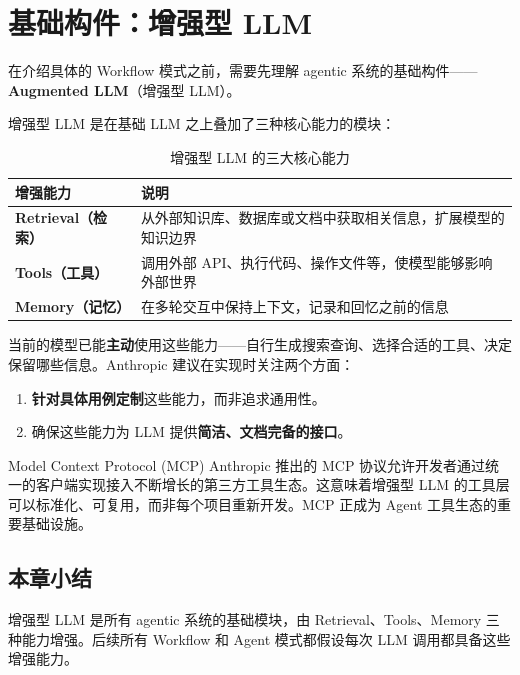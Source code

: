\section{基础构件：增强型 LLM}

在介绍具体的 Workflow 模式之前，需要先理解 agentic 系统的基础构件——\textbf{Augmented LLM}（增强型 LLM）。

增强型 LLM 是在基础 LLM 之上叠加了三种核心能力的模块：

\begin{table}[H]
\centering
\begin{tabular}{>{\bfseries}l p{10cm}}
\toprule
增强能力 & 说明 \\
\midrule
Retrieval（检索） & 从外部知识库、数据库或文档中获取相关信息，扩展模型的知识边界 \\
Tools（工具） & 调用外部 API、执行代码、操作文件等，使模型能够影响外部世界 \\
Memory（记忆） & 在多轮交互中保持上下文，记录和回忆之前的信息 \\
\bottomrule
\end{tabular}
\caption{增强型 LLM 的三大核心能力}
\end{table}

当前的模型已能\textbf{主动}使用这些能力——自行生成搜索查询、选择合适的工具、决定保留哪些信息。Anthropic 建议在实现时关注两个方面：

\begin{enumerate}
    \item \textbf{针对具体用例定制}这些能力，而非追求通用性。
    \item 确保这些能力为 LLM 提供\textbf{简洁、文档完备的接口}。
\end{enumerate}

\begin{knowledgebox}{Model Context Protocol (MCP)}
Anthropic 推出的 MCP 协议允许开发者通过统一的客户端实现接入不断增长的第三方工具生态。这意味着增强型 LLM 的工具层可以标准化、可复用，而非每个项目重新开发。MCP 正成为 Agent 工具生态的重要基础设施。
\end{knowledgebox}

\subsection{本章小结}
增强型 LLM 是所有 agentic 系统的基础模块，由 Retrieval、Tools、Memory 三种能力增强。后续所有 Workflow 和 Agent 模式都假设每次 LLM 调用都具备这些增强能力。


